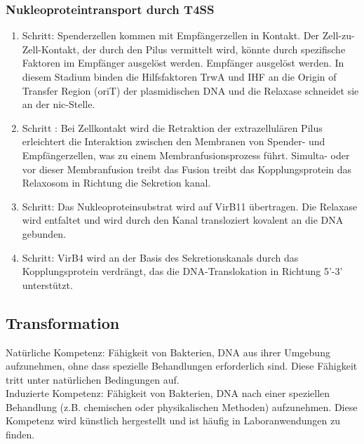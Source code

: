 \subsubsection{Nukleoproteintransport durch T4SS} 
\begin{enumerate}
    \item Schritt: Spenderzellen kommen mit Empfängerzellen in Kontakt. Der Zell-zu-Zell-Kontakt, der durch den Pilus  vermittelt wird,
könnte durch spezifische Faktoren im Empfänger ausgelöst werden.
Empfänger ausgelöst werden. In diesem Stadium binden die Hilfsfaktoren
TrwA und IHF an die Origin of Transfer Region (oriT)  der plasmidischen DNA und die
Relaxase  schneidet sie an der nic-Stelle. 
\item Schritt : Bei Zellkontakt wird die Retraktion der
extrazellulären
Pilus 
erleichtert
die
Interaktion zwischen den Membranen von
Spender- und Empfängerzellen, was zu einem
Membranfusionsprozess führt. Simulta-
oder vor dieser Membranfusion treibt das
Fusion treibt das Kopplungsprotein das
Relaxosom 
in Richtung
die
Sekretion
kanal.
\item Schritt: Das Nukleoproteinsubstrat wird
auf VirB11  übertragen.
Die Relaxase  wird entfaltet und
wird durch den Kanal transloziert
kovalent an die DNA gebunden.
\item Schritt: VirB4  wird an der Basis des Sekretionskanals durch das Kopplungsprotein verdrängt, das die DNA-Translokation in Richtung 5'-3' unterstützt.
\end{enumerate}
\subsection{Transformation}
\begin{mybox}[title=Natüliche Kompetenz und induzierte Kompetenz]
Natürliche Kompetenz: Fähigkeit von Bakterien, DNA aus ihrer Umgebung aufzunehmen, ohne dass spezielle Behandlungen erforderlich sind. Diese Fähigkeit tritt unter natürlichen Bedingungen auf. \\  
Induzierte Kompetenz: Fähigkeit von Bakterien, DNA nach einer speziellen Behandlung (z.B. chemischen oder physikalischen Methoden) aufzunehmen. Diese Kompetenz wird künstlich hergestellt und ist häufig in Laboranwendungen zu finden.
\end{mybox}
